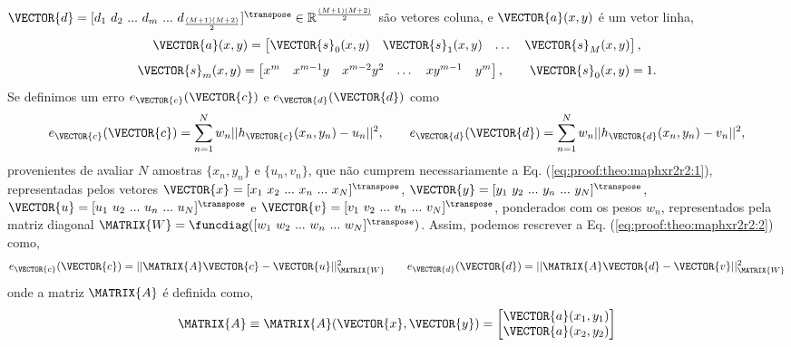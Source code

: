 \begin{myproofT}
$\VECTOR{d}=[d_1~ d_2~ ...~ d_m~ ...~ d_{\frac{(M+1)(M+2)}{2}}]^{\transpose} \in \mathbb{R}^{\frac{(M+1)(M+2)}{2}}$ 
são vetores coluna, e
$\VECTOR{a}(x,y)$ é um vetor linha,
\begin{equation}
\VECTOR{a}(x,y)= 
\begin{bmatrix}
\VECTOR{s}_{0}(x,y) & \VECTOR{s}_{1}(x,y) &  \dots  & \VECTOR{s}_{M}(x,y)
\end{bmatrix},
\end{equation}
\begin{equation}
\VECTOR{s}_{m}(x,y)=
\begin{bmatrix}
x^m  & x^{m-1} y  & x^{m-2} y^2    & \dots  & x y^{m-1} &  y^m 
\end{bmatrix},
\qquad
\VECTOR{s}_{0}(x,y)=1.
\end{equation}
Se definimos um erro $e_{\VECTOR{c}}(\VECTOR{c})$ e $e_{\VECTOR{d}}(\VECTOR{d})$ como
\begin{equation}\label{eq:proof:theo:maphxr2r2:2}
e_{\VECTOR{c}}(\VECTOR{c}) 
=  
\sum_{n=1}^{N} w_n||h_{\VECTOR{c}}(x_n,y_n)-u_n||^2,
\qquad
e_{\VECTOR{d}}(\VECTOR{d}) 
=  
\sum_{n=1}^{N} w_n||h_{\VECTOR{d}}(x_n,y_n)-v_n||^2,
\end{equation}
provenientes de avaliar $N$ amostras $\{x_n,y_n\}$ e $\{u_n,v_n\}$, 
que não cumprem necessariamente a Eq. (\ref{eq:proof:theo:maphxr2r2:1}), 
representadas pelos vetores 
$\VECTOR{x}=[x_1~ x_2~ ...~ x_n~ ...~ x_N]^{\transpose}$,
$\VECTOR{y}=[y_1~ y_2~ ...~ y_n~ ...~ y_N]^{\transpose}$, 
$\VECTOR{u}=[u_1~ u_2~ ...~ u_n~ ...~ u_N]^{\transpose}$ e
$\VECTOR{v}=[v_1~ v_2~ ...~ v_n~ ...~ v_N]^{\transpose}$,
ponderados com os pesos $w_n$, representados pela matriz diagonal $\MATRIX{W}=\funcdiag([w_1~ w_2~ ...~ w_n~ ...~ w_N]^{\transpose})$.
Assim, podemos rescrever a Eq. (\ref{eq:proof:theo:maphxr2r2:2}) como,
\begin{equation}\label{eq:proof:theo:maphxr2r2:3}
e_{\VECTOR{c}}(\VECTOR{c}) = ||\MATRIX{A}\VECTOR{c}-\VECTOR{u}||_{\MATRIX{W}}^2 
\qquad
e_{\VECTOR{d}}(\VECTOR{d}) = ||\MATRIX{A}\VECTOR{d}-\VECTOR{v}||_{\MATRIX{W}}^2 
\end{equation}
onde a matriz $\MATRIX{A}$ é definida como,
\begin{equation}\label{eq:proof:maphxr2r2:4}
\MATRIX{A}\equiv \MATRIX{A}(\VECTOR{x},\VECTOR{y})=\begin{bmatrix}
\VECTOR{a}(x_1,y_1)\\
\VECTOR{a}(x_2,y_2)\\

\end{bmatrix}
\end{equation}
\end{myproofT}
